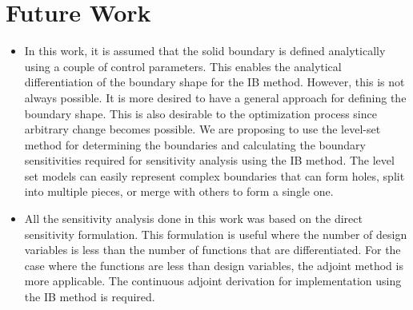 \section{Future Work}
\begin{itemize}
    \item In this work, it is assumed that the solid boundary is defined analytically using a couple of control parameters. This enables the analytical differentiation of the boundary shape for the IB method. However, this is not always possible. It is more desired to have a general approach for defining the boundary shape. This is also desirable to the optimization process since arbitrary change becomes possible. We are proposing to use the level-set method for determining the boundaries and calculating the boundary sensitivities required for sensitivity analysis using the IB method. The level set models can easily represent complex boundaries that can form holes, split into multiple pieces, or merge with others to form a single one.
    \item All the sensitivity analysis done in this work was based on the direct sensitivity formulation. This formulation is useful where the number of design variables is less than the number of functions that are differentiated. For the case where the functions are less than design variables, the adjoint method is more applicable. The continuous adjoint derivation for implementation using the IB method is required.
\end{itemize}
